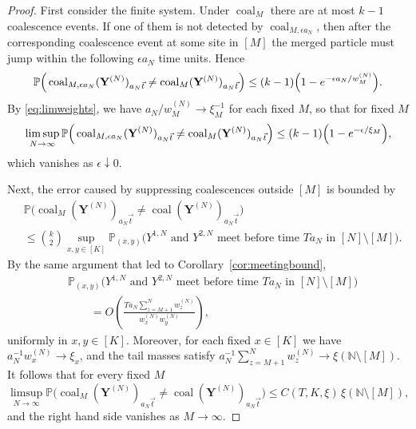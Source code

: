 \documentclass[11pt,a4paper]{scrartcl}
\numberwithin{equation}{section}
\theoremstyle{plain}
\theoremstyle{definition}
\theoremstyle{remark}
\newcommand{\bN}{\ensuremath{\mathbb{N}}}
\newcommand{\bP}{\ensuremath{\mathbb{P}}}
\begin{document}
\begin{proof}
	First consider the finite system. Under $\operatorname{coal}_{M}$ there are at most $k-1$ coalescence events. If one of them is not detected by $\operatorname{coal}_{M,\epsilon a_N}$, then after the corresponding coalescence event at some site in $[M]$ the merged particle must jump within the following $\epsilon a_N$ time units. Hence
	\begin{equation}\label{eq:finite-time-disc}
		\bP\Big( \operatorname{coal}_{M,\epsilon a_N}(\mathbf{Y}^{(N)})_{a_N\vec{t}}\neq \operatorname{coal}_{M}(\mathbf{Y}^{(N)})_{a_N\vec{t}} \Big)
		\leq (k-1)\Big(1-\textup{e}^{-\epsilon a_N/w_M^{(N)}}\Big).
	\end{equation}
	By \eqref{eq:limweights}, we have $a_N/w_M^{(N)}\to \xi_M^{-1}$ for each fixed $M$, so that for fixed $M$
	\begin{equation}\label{eq:finite-time-disc-limit}
		\limsup_{N\to\infty}\bP\Big( \operatorname{coal}_{M,\epsilon a_N}(\mathbf{Y}^{(N)})_{a_N\vec{t}}\neq \operatorname{coal}_{M}(\mathbf{Y}^{(N)})_{a_N\vec{t}} \Big)
		\leq (k-1)\Big(1-\textup{e}^{-\epsilon/\xi_M}\Big),
	\end{equation}
	which vanishes as $\epsilon\downarrow 0$.

	Next, the error caused by suppressing coalescences outside $[M]$ is bounded by
	\begin{align}
		& \bP\big( \operatorname{coal}_{M} (\mathbf{Y}^{(N)})_{a_N\vec{t}}\neq \operatorname{coal}(\mathbf{Y}^{(N)})_{a_N\vec{t}} \big)\nonumber\\
		&\leq \binom{k}{2} \sup_{x,y\in [K]} \bP_{(x,y)}\Big( Y^{1,N}\text{ and } Y^{2,N} \text{ meet before time }Ta_N \text{ in }[N]\setminus[M]\Big). \label{eq:finite-space-disc}
	\end{align}
	By the same argument that led to Corollary~\ref{cor:meetingbound},
	\[
	\begin{aligned}
	&\bP_{(x,y)}\Big( Y^{1,N}\text{ and } Y^{2,N} \text{ meet before time }Ta_N \text{ in }[N]\setminus[M]\Big)\\
	&\qquad =O\left(\frac{T a_N \sum_{z=M+1}^N w^{(N)}_z}{w^{(N)}_x w^{(N)}_y} \right),
	\end{aligned}
	\]
	uniformly in $x,y\in[K]$. Moreover, for each fixed $x\in[K]$ we have
	$a_N^{-1}w_x^{(N)}\to\xi_x$, and the tail masses satisfy
	$a_N^{-1}\sum_{z=M+1}^N w^{(N)}_z\to \xi(\bN\setminus[M])$.
	It follows that for every fixed $M$
	\begin{equation}\label{eq:finite-space-disc-limit}
		\limsup_{N\to\infty}\bP\big( \operatorname{coal}_{M} (\mathbf{Y}^{(N)})_{a_N\vec{t}}\neq \operatorname{coal}(\mathbf{Y}^{(N)})_{a_N\vec{t}} \big)
		\leq C(T,K,\xi)\,\xi(\bN\setminus[M]),
	\end{equation}
	and the right hand side vanishes as $M\to\infty$.


\end{proof}
\end{document}
